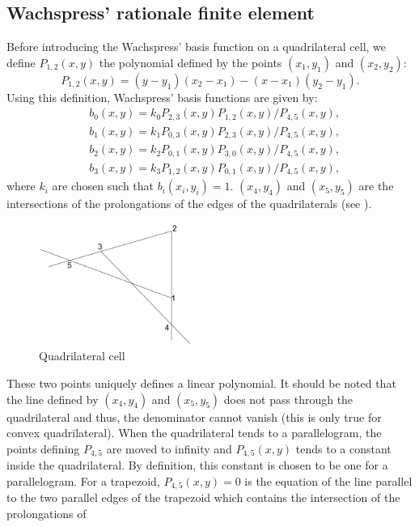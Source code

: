 \subsection{Wachspress' rationale finite element}
Before introducing the Wachspress' basis function on a quadrilateral cell, 
we define $P_{1,2}(x,y)$ the polynomial defined by the points $(x_1,y_1)$ and
$(x_2,y_2)$:
\begin{equation}
  P_{1,2}(x,y) = (y-y_1) (x_2-x_1)-(x-x_1)(y_2-y_1).
\end{equation}  
Using this definition, Wachspress' basis functions are given by:
\begin{align}
  &b_0(x,y) = k_0 P_{2,3}(x,y)P_{1,2}(x,y)/P_{4,5}(x,y),\\
  &b_1(x,y) = k_1 P_{0,3}(x,y)P_{2,3}(x,y)/P_{4,5}(x,y),\\
  &b_2(x,y) = k_2 P_{0,1}(x,y)P_{3,0}(x,y)/P_{4,5}(x,y),\\
  &b_3(x,y) = k_3 P_{1,2}(x,y)P_{0,1}(x,y)/P_{4,5}(x,y),
\end{align}
where $k_i$ are chosen such that $b_i(x_i,y_i)=1$. $(x_4,y_4)$ and $(x_5,y_5)$
are the intersections of the prolongations of the edges 
of the quadrilaterals (see ).
\begin{figure}[H]
  \centering
  \includegraphics[width=5cm]{quadrilateral}
  \caption{Quadrilateral cell}
  \label{fig_quadrilateral}
\end{figure}
These two points uniquely defines a linear polynomial. It should be noted that 
the line defined by $(x_4,y_4)$ and $(x_5,y_5)$ does not pass through the 
quadrilateral and thus, the denominator cannot vanish (this is 
only true for convex quadrilateral). When the quadrilateral tends to a 
parallelogram, the points defining $P_{4,5}$ are moved to infinity and 
$P_{4,5}(x,y)$ tends to a constant inside the quadrilateral. By definition, 
this constant is chosen to be one for a parallelogram. For a trapezoid,
$P_{4,5}(x,y)=0$ is the equation of the line parallel to the two parallel
edges of the trapezoid which contains the intersection of the prolongations of
